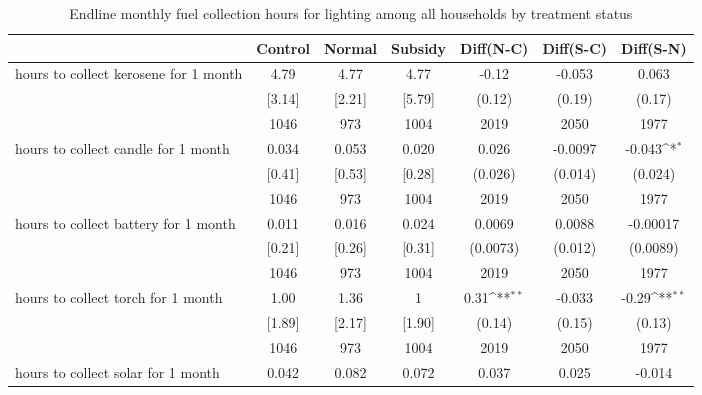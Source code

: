 \begin{table}[htbp]\centering
\def\sym#1{\ifmmode^{#1}\else\(^{#1}\)\fi}
\caption{Endline monthly fuel collection hours for lighting among all households by treatment status \label{tab:"balance"}}
\begin{tabular*}{1\hsize}{@{\hskip\tabcolsep\extracolsep\fill}l*{1}{cccccc}}
\toprule
                                &  Control&   Normal&  Subsidy&Diff(N-C)         &Diff(S-C)         &Diff(S-N)         \\
\midrule
hours to collect kerosene for 1 month&     4.79&     4.77&     4.77&    -0.12         &   -0.053         &    0.063         \\
                                &   [3.14]&   [2.21]&   [5.79]&   (0.12)         &   (0.19)         &   (0.17)         \\
                                &     1046&      973&     1004&     2019         &     2050         &     1977         \\
hours to collect candle for 1 month&    0.034&    0.053&    0.020&    0.026         &  -0.0097         &   -0.043\sym{*}  \\
                                &   [0.41]&   [0.53]&   [0.28]&  (0.026)         &  (0.014)         &  (0.024)         \\
                                &     1046&      973&     1004&     2019         &     2050         &     1977         \\
hours to collect battery for 1 month&    0.011&    0.016&    0.024&   0.0069         &   0.0088         & -0.00017         \\
                                &   [0.21]&   [0.26]&   [0.31]& (0.0073)         &  (0.012)         & (0.0089)         \\
                                &     1046&      973&     1004&     2019         &     2050         &     1977         \\
hours to collect torch for 1 month&     1.00&     1.36&        1&     0.31\sym{**} &   -0.033         &    -0.29\sym{**} \\
                                &   [1.89]&   [2.17]&   [1.90]&   (0.14)         &   (0.15)         &   (0.13)         \\
                                &     1046&      973&     1004&     2019         &     2050         &     1977         \\
hours to collect solar for 1 month&    0.042&    0.082&    0.072&    0.037         &    0.025         &   -0.014         \\

\end{tabular*}
\end{table}
